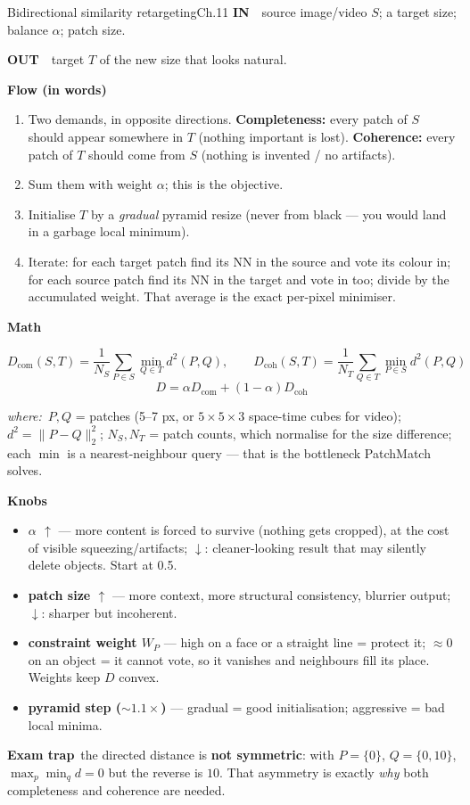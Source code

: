 \documentclass[9pt,a4paper]{extarticle}
\newcommand{\IN}{\textbf{\color{cIn}IN}\ }
\newcommand{\OUT}{\par\textbf{\color{cOut}OUT}\ }
\newcommand{\FLOW}{\par\smallskip\textbf{Flow (in words)}\par\nopagebreak}
\newcommand{\MATH}{\par\smallskip\textbf{Math}\par\nopagebreak}
\newcommand{\KNOBS}{\par\smallskip\textbf{Knobs}\par\nopagebreak}
\newcommand{\TRAP}{\par\smallskip\textbf{\color{cTrap}Exam trap}\ }
\newcommand{\WHERE}{\par\textit{where:}\ }
\newcommand{\up}{$\uparrow$}
\newcommand{\dn}{$\downarrow$}
\newcommand{\kn}[2]{\item \textbf{#1} --- #2}
\begin{document}
\begin{card}{Bidirectional similarity retargeting}{Ch.11}
\IN\ source image/video $S$; a target size; balance $\alpha$; patch size.
\OUT\ target $T$ of the new size that looks natural.

\FLOW
\begin{enumerate}
  \item Two demands, in opposite directions. \textbf{Completeness:} every patch of $S$ should appear somewhere in $T$ (nothing important is lost). \textbf{Coherence:} every patch of $T$ should come from $S$ (nothing is invented / no artifacts).
  \item Sum them with weight $\alpha$; this is the objective.
  \item Initialise $T$ by a \emph{gradual} pyramid resize (never from black --- you would land in a garbage local minimum).
  \item Iterate: for each target patch find its NN in the source and vote its colour in; for each source patch find its NN in the target and vote in too; divide by the accumulated weight. That average is the exact per-pixel minimiser.
\end{enumerate}

\MATH
\[ D_{\text{com}}(S,T)=\frac1{N_S}\sum_{P\in S}\min_{Q\in T}d^2(P,Q),\qquad
D_{\text{coh}}(S,T)=\frac1{N_T}\sum_{Q\in T}\min_{P\in S}d^2(P,Q) \]
\[ D=\alpha D_{\text{com}}+(1-\alpha)D_{\text{coh}} \]
\WHERE $P,Q$ = patches (5--7 px, or $5\times5\times3$ space-time cubes for video); $d^2=\|P-Q\|_2^2$; $N_S,N_T$ = patch counts, which normalise for the size difference; each $\min$ is a nearest-neighbour query --- that is the bottleneck PatchMatch solves.

\KNOBS
\begin{itemize}
  \kn{$\alpha$ \up}{more content is forced to survive (nothing gets cropped), at the cost of visible squeezing/artifacts; \dn: cleaner-looking result that may silently delete objects. Start at 0.5.}
  \kn{patch size \up}{more context, more structural consistency, blurrier output; \dn: sharper but incoherent.}
  \kn{constraint weight $W_P$}{high on a face or a straight line = protect it; $\approx0$ on an object = it cannot vote, so it vanishes and neighbours fill its place. Weights keep $D$ convex.}
  \kn{pyramid step ($\sim1.1\times$)}{gradual = good initialisation; aggressive = bad local minima.}
\end{itemize}
\TRAP the directed distance is \textbf{not symmetric}: with $P=\{0\}$, $Q=\{0,10\}$, $\max_p\min_q d=0$ but the reverse is $10$. That asymmetry is exactly \emph{why} both completeness and coherence are needed.
\end{card}
\end{document}
